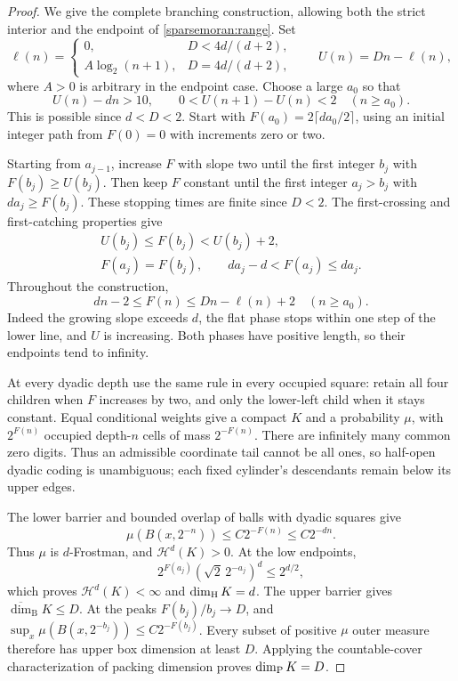 \begin{proof}
We give the complete branching construction, allowing both the strict
interior and the endpoint of \eqref{sparsemoran:range}. Set
\[
 \ell(n)=
 \begin{cases}
  0,&D<4d/(d+2),\\
  A\log_2(n+1),&D=4d/(d+2),
 \end{cases}
 \qquad U(n)=Dn-\ell(n),
\]
where \(A>0\) is arbitrary in the endpoint case.
Choose a large \(a_0\) so that
\[
 U(n)-dn>10,\qquad 0<U(n+1)-U(n)<2
 \quad(n\ge a_0).
\]
This is possible since \(d<D<2\).
Start with \(F(a_0)=2\lceil da_0/2\rceil\), using an initial
integer path from \(F(0)=0\) with increments zero or two.

Starting from \(a_{j-1}\), increase \(F\) with slope two until
the first integer \(b_j\) with \(F(b_j)\ge U(b_j)\). Then keep
\(F\) constant until the first integer \(a_j>b_j\) with
\(da_j\ge F(b_j)\). These stopping times are finite since
\(D<2\). The first-crossing and first-catching properties give
\begin{equation}\label{sparsemoran:stops}
 \begin{gathered}
 U(b_j)\le F(b_j)<U(b_j)+2,\\
 F(a_j)=F(b_j),\qquad da_j-d<F(a_j)\le da_j.
 \end{gathered}
\end{equation}
Throughout the construction,
\begin{equation}\label{sparsemoran:barriers}
 dn-2\le F(n)\le Dn-\ell(n)+2
 \quad(n\ge a_0).
\end{equation}
Indeed the growing slope exceeds \(d\), the flat phase stops within
one step of the lower line, and \(U\) is increasing. Both phases
have positive length, so their endpoints tend to infinity.

At every dyadic depth use the same rule in every occupied square:
retain all four children when \(F\) increases by two, and only the
lower-left child when it stays constant. Equal conditional weights
give a compact \(K\) and a probability \(\mu\), with \(2^{F(n)}\)
occupied depth-\(n\) cells of mass \(2^{-F(n)}\).
There are infinitely many common zero digits. Thus an admissible
coordinate tail cannot be all ones, so half-open dyadic coding is
unambiguous; each fixed cylinder's descendants remain below its
upper edges.

The lower barrier and bounded overlap of balls with dyadic squares
give
\[
 \mu(B(x,2^{-n}))\le C2^{-F(n)}\le C2^{-dn}.
\]
Thus \(\mu\) is \(d\)-Frostman, and \(\mathcal H^d(K)>0\).
At the low endpoints,
\[
 2^{F(a_j)}(\sqrt2\,2^{-a_j})^d\le2^{d/2},
\]
which proves \(\mathcal H^d(K)<\infty\) and \(\dim_{\mathrm H} K=d\).
The upper barrier gives \(\overline{\dim}_{\mathrm B}K\le D\).
At the peaks \(F(b_j)/b_j\to D\), and
\(\sup_x\mu(B(x,2^{-b_j}))\le C2^{-F(b_j)}\).
Every subset of positive \(\mu\) outer measure therefore has upper
box dimension at least \(D\). Applying the countable-cover
characterization of packing dimension proves \(\dim_{\mathrm P} K=D\).


\end{proof}
